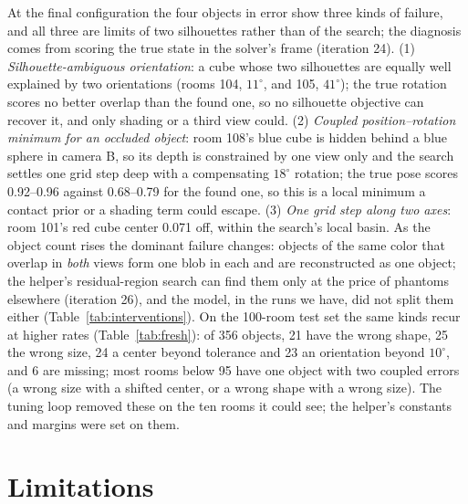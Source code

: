 \documentclass[10pt,a4paper]{article}
\begin{document}
At the final configuration the four objects in error show three kinds of failure, and all three are limits of two silhouettes rather than of the search; the diagnosis comes from scoring the true state in the solver's frame (iteration 24). (1) \emph{Silhouette-ambiguous orientation}: a cube whose two silhouettes are equally well explained by two orientations (rooms 104, $11^\circ$, and 105, $41^\circ$); the true rotation scores no better overlap than the found one, so no silhouette objective can recover it, and only shading or a third view could. (2) \emph{Coupled position--rotation minimum for an occluded object}: room 108's blue cube is hidden behind a blue sphere in camera B, so its depth is constrained by one view only and the search settles one grid step deep with a compensating $18^\circ$ rotation; the true pose scores 0.92--0.96 against 0.68--0.79 for the found one, so this is a local minimum a contact prior or a shading term could escape. (3) \emph{One grid step along two axes}: room 101's red cube center 0.071 off, within the search's local basin. As the object count rises the dominant failure changes: objects of the same color that overlap in \emph{both} views form one blob in each and are reconstructed as one object; the helper's residual-region search can find them only at the price of phantoms elsewhere (iteration 26), and the model, in the runs we have, did not split them either (Table~\ref{tab:interventions}). On the 100-room test set the same kinds recur at higher rates (Table~\ref{tab:fresh}): of 356 objects, 21 have the wrong shape, 25 the wrong size, 24 a center beyond tolerance and 23 an orientation beyond $10^\circ$, and 6 are missing; most rooms below 95 have one object with two coupled errors (a wrong size with a shifted center, or a wrong shape with a wrong size). The tuning loop removed these on the ten rooms it could see; the helper's constants and margins were set on them.

\section{Limitations}
\label{sec:limitations}
\end{document}
